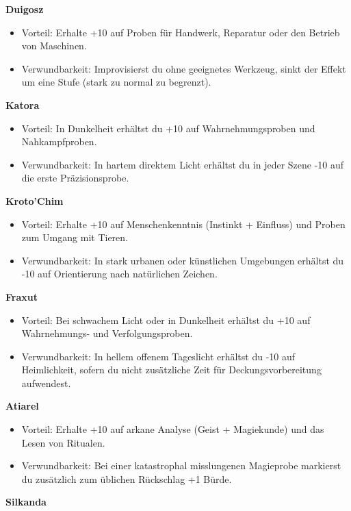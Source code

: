 \noindent\textbf{Duigosz}\par
\begin{itemize}[leftmargin=*,nosep]
\item Vorteil: Erhalte +10 auf Proben für Handwerk, Reparatur oder den Betrieb von Maschinen.
\item Verwundbarkeit: Improvisierst du ohne geeignetes Werkzeug, sinkt der Effekt um eine Stufe (stark zu normal zu begrenzt).
\end{itemize}
\noindent\textbf{Katora}\par
\begin{itemize}[leftmargin=*,nosep]
\item Vorteil: In Dunkelheit erhältst du +10 auf Wahrnehmungsproben und Nahkampfproben.
\item Verwundbarkeit: In hartem direktem Licht erhältst du in jeder Szene -10 auf die erste Präzisionsprobe.
\end{itemize}
\noindent\textbf{Kroto'Chim}\par
\begin{itemize}[leftmargin=*,nosep]
\item Vorteil: Erhalte +10 auf Menschenkenntnis (Instinkt + Einfluss) und Proben zum Umgang mit Tieren.
\item Verwundbarkeit: In stark urbanen oder künstlichen Umgebungen erhältst du -10 auf Orientierung nach natürlichen Zeichen.
\end{itemize}
\noindent\textbf{Fraxut}\par
\begin{itemize}[leftmargin=*,nosep]
\item Vorteil: Bei schwachem Licht oder in Dunkelheit erhältst du +10 auf Wahrnehmungs- und Verfolgungsproben.
\item Verwundbarkeit: In hellem offenem Tageslicht erhältst du -10 auf Heimlichkeit, sofern du nicht zusätzliche Zeit für Deckungsvorbereitung aufwendest.
\end{itemize}
\noindent\textbf{Atiarel}\par
\begin{itemize}[leftmargin=*,nosep]
\item Vorteil: Erhalte +10 auf arkane Analyse (Geist + Magiekunde) und das Lesen von Ritualen.
\item Verwundbarkeit: Bei einer katastrophal misslungenen Magieprobe markierst du zusätzlich zum üblichen Rückschlag +1 Bürde.
\end{itemize}
\noindent\textbf{Silkanda}\par
